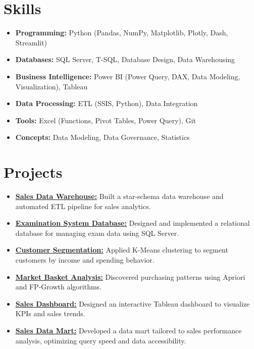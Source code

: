 \documentclass[10pt, letterpaper]{article}
\begin{document}
    \section*{Skills}
        \begin{itemize}[leftmargin=*]
              \item \textbf{Programming:} Python (Pandas, NumPy, Matplotlib, Plotly, Dash, Streamlit)
              \item \textbf{Databases:} SQL Server, T-SQL, Database Design, Data Warehousing
              \item \textbf{Business Intelligence:} Power BI (Power Query, DAX, Data Modeling, Visualization), Tableau
              \item \textbf{Data Processing:} ETL (SSIS, Python), Data Integration
              \item \textbf{Tools:} Excel (Functions, Pivot Tables, Power Query), Git
              \item \textbf{Concepts:} Data Modeling, Data Governance, Statistics
        \end{itemize}
    
   \section*{Projects}
        \begin{itemize}[leftmargin=*]
            \item {\href{https://github.com/amaradelhasan/Sales-DWH-}{\textbf{\underline{Sales Data Warehouse}:}}} Built a star-schema data warehouse and automated ETL pipeline for sales analytics.
            \item {\href{https://github.com/amaradelhasan/ITI-Examination-database}{\textbf{\underline{{Examination System Database}:}}}} Designed and implemented a relational database for managing exam data using SQL Server.    
            \item {\href{https://github.com/amaradelhasan/K-Means_Clustering}{\underline{\textbf{Customer Segmentation:}}}} Applied K-Means clustering to segment customers by income and spending behavior.
            \item {\href{https://github.com/amaradelhasan/association_ruls/tree/main}{\underline{\textbf{Market Basket Analysis:}}}} Discovered purchasing patterns using Apriori and FP-Growth algorithms.
            \item {\href{https://public.tableau.com/app/profile/ammar.adel1444/vizzes}{\underline{\textbf{Sales Dashboard:}}}} Designed an interactive Tableau dashboard to visualize KPIs and sales trends.
            \item {\href{https://github.com/amaradelhasan/Sales-Data-Mart--SCD-}{\underline{\textbf{Sales Data Mart:}}}} Developed a data mart tailored to sales performance analysis, optimizing query speed and data accessibility.
        \end{itemize}
        
\end{document}
